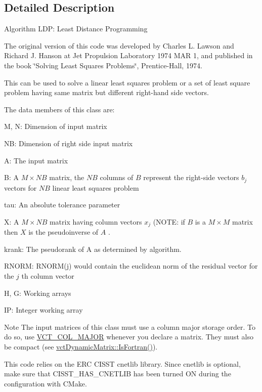 \subsection{Detailed Description}
Algorithm L\+D\+P\+: Least Distance Programming

The original version of this code was developed by Charles L. Lawson and Richard J. Hanson at Jet Propulsion Laboratory 1974 M\+A\+R 1, and published in the book \char`\"{}\+Solving Least Squares Problems\char`\"{}, Prentice-\/\+Hall, 1974.

This can be used to solve a linear least squares problem or a set of least square problem having same matrix but different right-\/hand side vectors.

The data members of this class are\+:
\begin{DoxyItemize}
\item M, N\+: Dimension of input matrix
\item N\+B\+: Dimension of right side input matrix
\item A\+: The input matrix
\item B\+: A $ M \times NB $ matrix, the $ NB $ columns of $ B $ represent the right-\/side vectors $ b_j $ vectors for $ NB $ linear least squares problem
\item tau\+: An absolute tolerance parameter
\item X\+: A $ M \times NB $ matrix having column vectors $ x_j $ (N\+O\+T\+E\+: if $ B $ is a $ M \times M $ matrix then $ X $ is the pseudoinverse of $ A $ .
\item krank\+: The pseudorank of A as determined by algorithm.
\item R\+N\+O\+R\+M\+: R\+N\+O\+R\+M(j) would contain the euclidean norm of the residual vector for the $ j $ th column vector
\item H, G\+: Working arrays
\item I\+P\+: Integer working array
\end{DoxyItemize}

\begin{DoxyNote}{Note}
The input matrices of this class must use a column major storage order. To do so, use \hyperlink{vct_forward_declarations_8h_a432cdf8923afaf82f551450ad4034746}{V\+C\+T\+\_\+\+C\+O\+L\+\_\+\+M\+A\+J\+O\+R} whenever you declare a matrix. They must also be compact (see \hyperlink{classvct_dynamic_const_matrix_base_aac5f19015b4888f760f99daa4bac199c}{vct\+Dynamic\+Matrix\+::\+Is\+Fortran()}).

This code relies on the E\+R\+C C\+I\+S\+S\+T cnetlib library. Since cnetlib is optional, make sure that C\+I\+S\+S\+T\+\_\+\+H\+A\+S\+\_\+\+C\+N\+E\+T\+L\+I\+B has been turned O\+N during the configuration with C\+Make. 
\end{DoxyNote}



